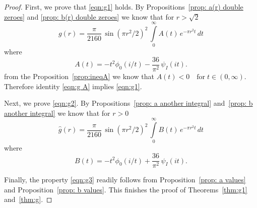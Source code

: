 \begin{proof}
First, we prove that \eqref{eqn:g1} holds. By Propositions~\ref{prop: a(r) double zeroes} and \ref{prop: b(r) double zeroes} we know that for $r>\sqrt{2}$
\begin{equation}\label{eqn:g A} g(r)=\frac{\pi}{2160}\,\sin(\pi r^2/2)^2\,\int\limits_0^\infty A(t)\,e^{-\pi r^2 t}\,dt\end{equation}
where $$A(t)=-t^2\phi_0(i/t)-\frac{36}{\pi^2}\,\psi_I(it).$$
from the Proposition~\ref{prop:ineqA} we know that $A(t)<0\quad\mbox{for}\;t\in(0,\infty).$
Therefore identity \eqref{eqn:g A} implies \eqref{eqn:g1}.

Next, we prove \eqref{eqn:g2}. By Propositions~\ref{prop: a another integral} and~\ref{prop: b another integral} we know that for $r>0$
\begin{equation}\label{eqn:g B} \widehat{g}(r)=\frac{\pi}{2160}\,\sin(\pi r^2/2)^2\,\int\limits_0^\infty B(t)\,e^{-\pi r^2 t}\,dt\end{equation}
where $$B(t)=-t^2\phi_0(i/t)+\frac{36}{\pi^2}\,\psi_I(it).$$


Finally, the property \eqref{eqn:g3} readily follows from Proposition~\ref{prop: a values} and Proposition~\ref{prop: b values}.
This finishes the proof of Theorems~\ref{thm:g1} and~\ref{thm:g}.
\end{proof}

